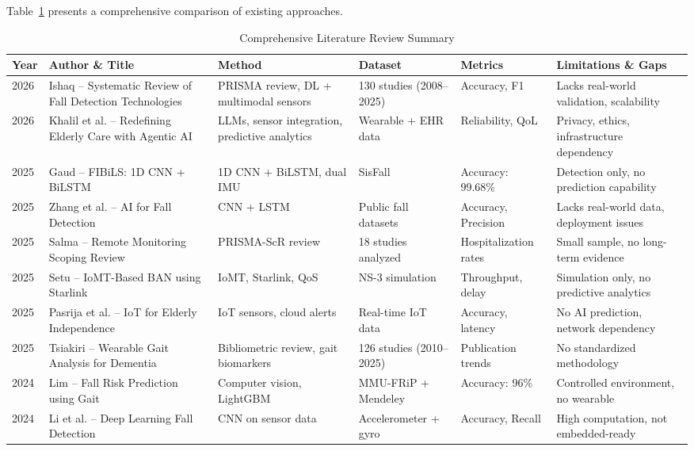 \documentclass[conference]{IEEEtran}
\begin{document}
Table~\ref{tab:litreview} presents a comprehensive comparison of existing approaches.

\begin{table}[!t]
\caption{Comprehensive Literature Review Summary}
\label{tab:litreview}
\centering
\footnotesize
\begin{tabular}{|p{0.8cm}|p{2.8cm}|p{2.5cm}|p{2.2cm}|p{1.8cm}|p{3.5cm}|}
\hline
\textbf{Year} & \textbf{Author \& Title} & \textbf{Method} & \textbf{Dataset} & \textbf{Metrics} & \textbf{Limitations \& Gaps} \\
\hline
2026 & Ishaq -- Systematic Review of Fall Detection Technologies & PRISMA review, DL + multimodal sensors & 130 studies (2008--2025) & Accuracy, F1 & Lacks real-world validation, scalability \\
\hline
2026 & Khalil et al. -- Redefining Elderly Care with Agentic AI & LLMs, sensor integration, predictive analytics & Wearable + EHR data & Reliability, QoL & Privacy, ethics, infrastructure dependency \\
\hline
2025 & Gaud -- FIBiLS: 1D CNN + BiLSTM & 1D CNN + BiLSTM, dual IMU & SisFall & Accuracy: 99.68\% & Detection only, no prediction capability \\
\hline
2025 & Zhang et al. -- AI for Fall Detection & CNN + LSTM & Public fall datasets & Accuracy, Precision & Lacks real-world data, deployment issues \\
\hline
2025 & Salma -- Remote Monitoring Scoping Review & PRISMA-ScR review & 18 studies analyzed & Hospitalization rates & Small sample, no long-term evidence \\
\hline
2025 & Setu -- IoMT-Based BAN using Starlink & IoMT, Starlink, QoS & NS-3 simulation & Throughput, delay & Simulation only, no predictive analytics \\
\hline
2025 & Pasrija et al. -- IoT for Elderly Independence & IoT sensors, cloud alerts & Real-time IoT data & Accuracy, latency & No AI prediction, network dependency \\
\hline
2025 & Tsiakiri -- Wearable Gait Analysis for Dementia & Bibliometric review, gait biomarkers & 126 studies (2010--2025) & Publication trends & No standardized methodology \\
\hline
2024 & Lim -- Fall Risk Prediction using Gait & Computer vision, LightGBM & MMU-FRiP + Mendeley & Accuracy: 96\% & Controlled environment, no wearable \\
\hline
2024 & Li et al. -- Deep Learning Fall Detection & CNN on sensor data & Accelerometer + gyro & Accuracy, Recall & High computation, not embedded-ready \\

\end{tabular}
\end{table}
\end{document}
